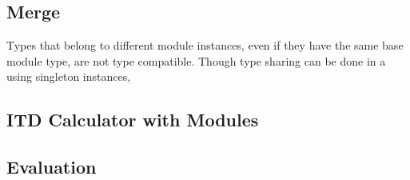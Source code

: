 \subsection{Merge}

Types that belong to different module instances, even if they have the same
base module type, are not type compatible. Though type sharing can be done
in a using singleton instances, 




\subsection{ITD Calculator with Modules}

\subsection{Evaluation}


